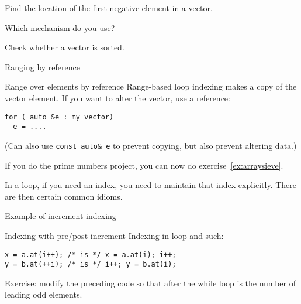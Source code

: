\begin{exercise}
  \label{ex:array-maxidx}
  Find the location of the first negative element in a vector.

  Which mechanism do you use?
\end{exercise}

\begin{exercise}
  \label{ex:array-sorted}
  Check whether a vector is sorted.
\end{exercise}

 {Ranging by reference}

\begin{block}{Range over elements by reference}
  \label{sl:vector-range-ref}
  Range-based loop indexing makes a copy of the vector element. If you
  want to alter the vector, use a reference:
\begin{lstlisting}
for ( auto &e : my_vector)
  e = ....
\end{lstlisting}
%

(Can also use \lstinline{const auto& e} to prevent copying, but also
prevent altering data.)
\end{block}

\begin{exercise}
  If you do the prime numbers project, you can now do exercise~\ref{ex:arraysieve}.
\end{exercise}

In a  loop, if you need an index,
you need to maintain that index explicitly.
There are then certain common idioms.

\begin{block}{Example of increment indexing}
  \label{sl:plusplusexample}
\end{block}

\begin{slide}{Indexing with pre/post increment}
  \label{sl:prepostindex}
Indexing in  loop and such:
\begin{lstlisting}
x = a.at(i++); /* is */ x = a.at(i); i++;
y = b.at(++i); /* is */ i++; y = b.at(i);
\end{lstlisting}
\end{slide}

\begin{exercise}
  Exercise: modify the preceding code so that after the while loop
   is the number of leading odd elements.
\end{exercise}

